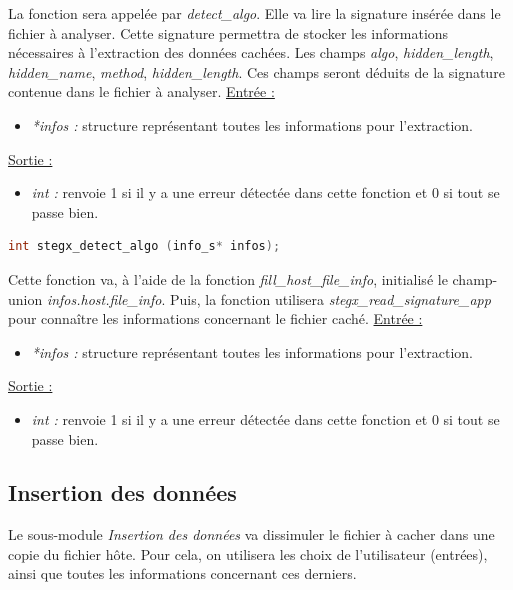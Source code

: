 \documentclass[11pt]{article}
\begin{document}
La fonction sera appelée par \textit{detect\_algo}.
Elle va lire la signature insérée dans le fichier à analyser. 
Cette signature permettra de stocker les informations nécessaires à 
l'extraction des données cachées. 
Les champs \textit{algo}, \textit{hidden\_length}, 
\textit{hidden\_name}, \textit{method}, \textit{hidden\_length}. Ces champs 
seront déduits de la signature contenue dans le fichier à analyser. 
\newline
\underline{Entrée :} 
\begin{itemize}
\item \textit{*infos :} structure représentant toutes les informations pour 
l'extraction.  
\end{itemize}
\underline{Sortie :} 
\begin{itemize}
\item \textit{int :} renvoie 1 si il y a une erreur détectée dans cette 
fonction et 0 si tout se passe bien.  
\newline 
\end{itemize}

\begin{lstlisting}[language=c]
int stegx_detect_algo (info_s* infos); 
\end{lstlisting}

Cette fonction va, à l'aide de la fonction \textit{fill\_host\_file\_info}, 
initialisé le champ-union \textit{infos.host.file\_info}. Puis, la 
fonction utilisera \textit{stegx\_read\_signature\_app} pour connaître les 
informations concernant le fichier caché. 
\newline
\underline{Entrée :} 
\begin{itemize}
\item \textit{*infos :} structure représentant toutes les informations pour 
l'extraction. 
\end{itemize}
\underline{Sortie :} 
\begin{itemize}
\item \textit{int :} renvoie 1 si il y a une erreur détectée dans cette 
fonction et 0 si tout se passe bien.  
\newline 
\end{itemize}

\subsection{Insertion des données}

Le sous-module \textit{Insertion des données} va dissimuler 
le fichier à cacher dans une copie du fichier hôte. Pour cela, on utilisera 
les choix de l'utilisateur (entrées), ainsi que toutes les informations 
concernant ces derniers. 
\end{document}
